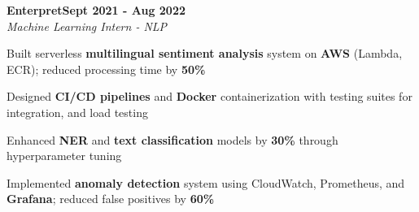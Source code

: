 \documentclass[letterpaper,10pt]{article}
\newcommand{\heading}[2]{
  \hspace{10pt}#1\hfill#2\\
}
\newcommand{\headingBf}[2]{
  \heading{\textbf{#1}}{\textbf{#2}}
}
\newcommand{\headingIt}[2]{
  \heading{\textit{#1}}{\textit{#2}}
}
\newenvironment{resume_list}{
  \vspace{-7pt}
  \begin{itemize}[itemsep=-2px, parsep=1pt, leftmargin=30pt]
}{
  \end{itemize}
}
\begin{document}


\headingBf{Enterpret}{Sept 2021 - Aug 2022}
\headingIt{Machine Learning Intern - NLP}{}
\begin{resume_list}
\item Built serverless \textbf{multilingual sentiment analysis} system on \textbf{AWS} (Lambda, ECR); reduced processing time by \textbf{50\%}
\item Designed \textbf{CI/CD pipelines} and \textbf{Docker} containerization with testing suites for integration, and load testing
\item Enhanced \textbf{NER} and \textbf{text classification} models by \textbf{30\%} through hyperparameter tuning
\item Implemented \textbf{anomaly detection} system using CloudWatch, Prometheus, and \textbf{Grafana}; reduced false positives by \textbf{60\%}
\end{resume_list}
\end{document}
